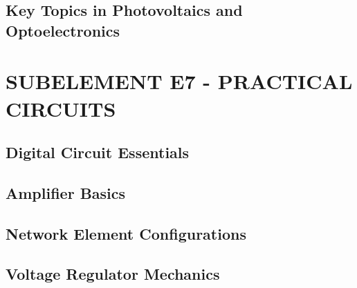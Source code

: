 \documentclass[12pt]{book}
\begin{document}
\section{Key Topics in Photovoltaics and Optoelectronics}











\chapter{SUBELEMENT E7 - PRACTICAL CIRCUITS}
\section{Digital Circuit Essentials}











\section{Amplifier Basics}












\section{Network Element Configurations}











\section{Voltage Regulator Mechanics}















\end{document}
